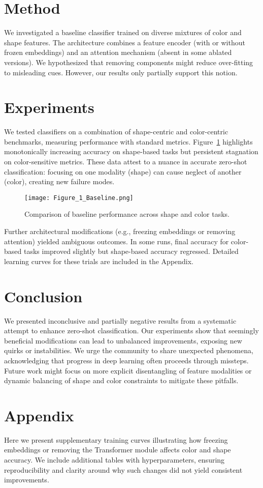 \documentclass[11pt]{article}
\begin{document}
\section{Method}
We investigated a baseline classifier trained on diverse mixtures of color and shape features. The architecture combines a feature encoder (with or without frozen embeddings) and an attention mechanism (absent in some ablated versions). We hypothesized that removing components might reduce over-fitting to misleading cues. However, our results only partially support this notion.

\section{Experiments}
We tested classifiers on a combination of shape-centric and color-centric benchmarks, measuring performance with standard metrics. Figure~\ref{fig:main} highlights monotonically increasing accuracy on shape-based tasks but persistent stagnation on color-sensitive metrics. These data attest to a nuance in accurate zero-shot classification: focusing on one modality (shape) can cause neglect of another (color), creating new failure modes.

\begin{figure}[t]
\centering
\texttt{[image: Figure\_1\_Baseline.png]}
\caption{Comparison of baseline performance across shape and color tasks.}
\label{fig:main}
\end{figure}

Further architectural modifications (e.g., freezing embeddings or removing attention) yielded ambiguous outcomes. In some runs, final accuracy for color-based tasks improved slightly but shape-based accuracy regressed. Detailed learning curves for these trials are included in the Appendix.

\section{Conclusion}
We presented inconclusive and partially negative results from a systematic attempt to enhance zero-shot classification. Our experiments show that seemingly beneficial modifications can lead to unbalanced improvements, exposing new quirks or instabilities. We urge the community to share unexpected phenomena, acknowledging that progress in deep learning often proceeds through missteps. Future work might focus on more explicit disentangling of feature modalities or dynamic balancing of shape and color constraints to mitigate these pitfalls.




\clearpage
\appendix
\section*{Appendix}
Here we present supplementary training curves illustrating how freezing embeddings or removing the Transformer module affects color and shape accuracy. We include additional tables with hyperparameters, ensuring reproducibility and clarity around why such changes did not yield consistent improvements.
\end{document}
